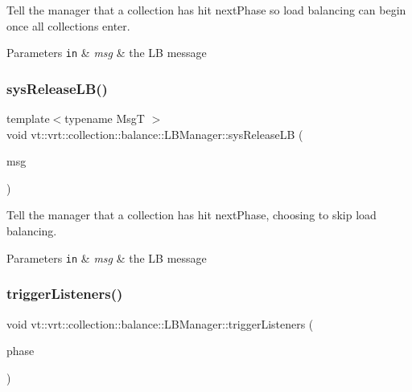 Tell the manager that a collection has hit {\ttfamily next\+Phase} so load balancing can begin once all collections enter. 


\begin{DoxyParams}[1]{Parameters}
\mbox{\tt in}  & {\em msg} & the LB message \\
\hline
\end{DoxyParams}
\mbox{\label{structvt_1_1vrt_1_1collection_1_1balance_1_1_l_b_manager_a50a782417c408ce3c33e7d70ebcd5d2e}} 
\subsubsection{\texorpdfstring{sys\+Release\+L\+B()}{sysReleaseLB()}}
{\footnotesize\ttfamily template$<$typename MsgT $>$ \\
void vt\+::vrt\+::collection\+::balance\+::\+L\+B\+Manager\+::sys\+Release\+LB (\begin{DoxyParamCaption}\item[{MsgT $\ast$}]{msg }\end{DoxyParamCaption})\hspace{0.3cm}{\ttfamily [inline]}}



Tell the manager that a collection has hit {\ttfamily next\+Phase}, choosing to skip load balancing. 


\begin{DoxyParams}[1]{Parameters}
\mbox{\tt in}  & {\em msg} & the LB message \\
\hline
\end{DoxyParams}
\mbox{\label{structvt_1_1vrt_1_1collection_1_1balance_1_1_l_b_manager_a9baae1400676077dbe9b8f1805fab395}} 
\subsubsection{\texorpdfstring{trigger\+Listeners()}{triggerListeners()}}
{\footnotesize\ttfamily void vt\+::vrt\+::collection\+::balance\+::\+L\+B\+Manager\+::trigger\+Listeners (\begin{DoxyParamCaption}\item[{\hyperlink{namespacevt_a46ce6733d5cdbd735d561b7b4029f6d7}{Phase\+Type}}]{phase }\end{DoxyParamCaption})}



